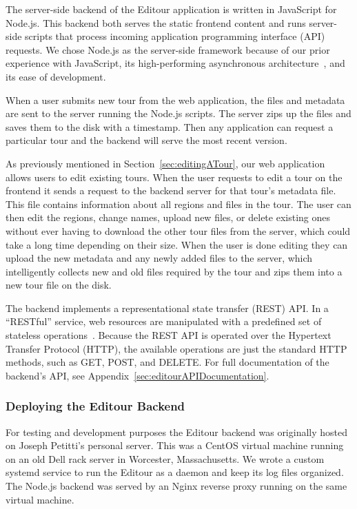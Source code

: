 \documentclass[a4paper, 10pt, american, titlepage]{article}
\begin{document}
The server-side backend of the Editour application is written in JavaScript for
Node.js. This backend both serves the static frontend content and runs
server-side scripts that process incoming application programming interface
(API) requests. We chose Node.js as the server-side framework because of our
prior experience with JavaScript, its high-performing asynchronous
architecture~\autocite{orsini2013}, and its ease of development.

When a user submits new tour from the web application, the files and metadata
are sent to the server running the Node.js scripts. The server zips up the files
and saves them to the disk with a timestamp. Then any application can request a
particular tour and the backend will serve the most recent version.

As previously mentioned in Section~\ref{sec:editingATour}, our web application
allows users to edit existing tours. When the user requests to edit a tour on
the frontend it sends a request to the backend server for that tour's metadata
file. This file contains information about all regions and files in the tour.
The user can then edit the regions, change names, upload new files, or delete
existing ones without ever having to download the other tour files from the
server, which could take a long time depending on their size. When the user is
done editing they can upload the new metadata and any newly added files to the
server, which intelligently collects new and old files required by the tour and
zips them into a new tour file on the disk.

The backend implements a representational state transfer (REST) API.
In a ``RESTful'' service, web resources are manipulated with a predefined set of
stateless operations~\autocite{rfc7231}. Because the REST API is operated over
the Hypertext Transfer Protocol (HTTP), the available operations are just the
standard HTTP methods, such as GET, POST, and DELETE. For full documentation of
the backend's API, see Appendix~\ref{sec:editourAPIDocumentation}.

\subsubsection{Deploying the Editour Backend}
\label{sec:deployingTheEditourBackend}

For testing and development purposes the Editour backend was originally hosted
on Joseph Petitti's personal server. This was a CentOS virtual machine running
on an old Dell rack server in Worcester, Massachusetts. We wrote a custom
systemd service to run the Editour as a daemon and keep its log files organized.
The Node.js backend was served by an Nginx reverse proxy running on the same
virtual machine.
\end{document}
